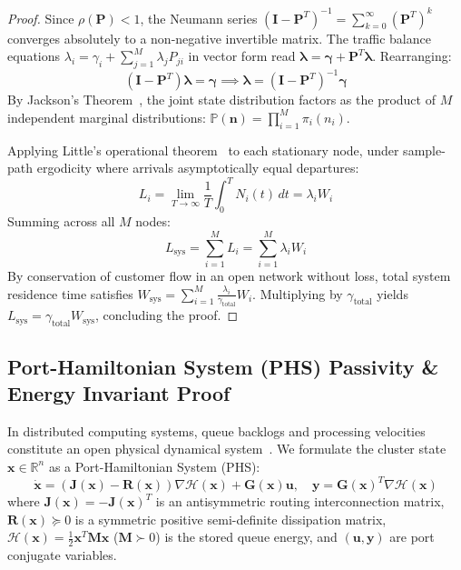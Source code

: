 \documentclass[letterpaper,twocolumn,10pt]{article}
\begin{document}
\begin{proof}
Since $\rho(\mathbf{P}) < 1$, the Neumann series $(\mathbf{I} - \mathbf{P}^T)^{-1} = \sum_{k=0}^{\infty} (\mathbf{P}^T)^k$ converges absolutely to a non-negative invertible matrix. The traffic balance equations $\lambda_i = \gamma_i + \sum_{j=1}^M \lambda_j P_{ji}$ in vector form read $\boldsymbol{\lambda} = \boldsymbol{\gamma} + \mathbf{P}^T \boldsymbol{\lambda}$. Rearranging:
\begin{equation}
(\mathbf{I} - \mathbf{P}^T) \boldsymbol{\lambda} = \boldsymbol{\gamma} \implies \boldsymbol{\lambda} = (\mathbf{I} - \mathbf{P}^T)^{-1} \boldsymbol{\gamma}
\end{equation}
By Jackson's Theorem~\cite{jackson1957networks}, the joint state distribution factors as the product of $M$ independent marginal distributions: $\mathbb{P}(\mathbf{n}) = \prod_{i=1}^M \pi_i(n_i)$. 

Applying Little's operational theorem~\cite{little1961proof} to each stationary node, under sample-path ergodicity where arrivals asymptotically equal departures:
\begin{equation}
L_i = \lim_{T \to \infty} \frac{1}{T} \int_0^T N_i(t)\,dt = \lambda_i W_i
\end{equation}
Summing across all $M$ nodes:
\begin{equation}
L_{\text{sys}} = \sum_{i=1}^M L_i = \sum_{i=1}^M \lambda_i W_i
\end{equation}
By conservation of customer flow in an open network without loss, total system residence time satisfies $W_{\text{sys}} = \sum_{i=1}^M \frac{\lambda_i}{\gamma_{\text{total}}} W_i$. Multiplying by $\gamma_{\text{total}}$ yields $L_{\text{sys}} = \gamma_{\text{total}} W_{\text{sys}}$, concluding the proof.
\end{proof}

\subsection{Port-Hamiltonian System (PHS) Passivity \& Energy Invariant Proof}
\label{sec:math_port_hamiltonian}
In distributed computing systems, queue backlogs and processing velocities constitute an open physical dynamical system~\cite{van2014port}. We formulate the cluster state $\mathbf{x} \in \mathbb{R}^n$ as a Port-Hamiltonian System (PHS):
\begin{equation}
\label{eq:phs_dynamics}
\dot{\mathbf{x}} = (\mathbf{J}(\mathbf{x}) - \mathbf{R}(\mathbf{x})) \nabla \mathcal{H}(\mathbf{x}) + \mathbf{G}(\mathbf{x})\mathbf{u}, \quad \mathbf{y} = \mathbf{G}(\mathbf{x})^T \nabla \mathcal{H}(\mathbf{x})
\end{equation}
where $\mathbf{J}(\mathbf{x}) = -\mathbf{J}(\mathbf{x})^T$ is an antisymmetric routing interconnection matrix, $\mathbf{R}(\mathbf{x}) \succeq 0$ is a symmetric positive semi-definite dissipation matrix, $\mathcal{H}(\mathbf{x}) = \frac{1}{2} \mathbf{x}^T \mathbf{M} \mathbf{x}$ ($\mathbf{M} \succ 0$) is the stored queue energy, and $(\mathbf{u}, \mathbf{y})$ are port conjugate variables.
\end{document}
